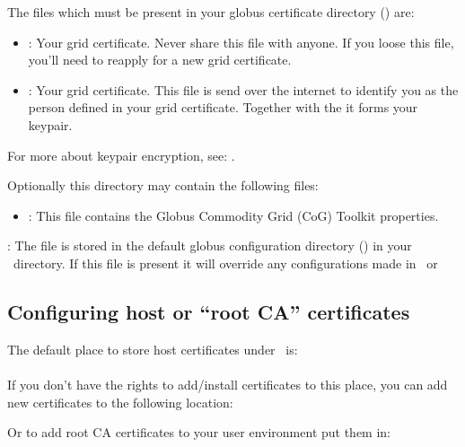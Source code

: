  The files which must be present in your globus certificate directory
 () are:

 \begin{itemize} 
   \item {} : 
     Your  grid certificate. Never share this file with anyone. If you 
     loose this file, you'll need to reapply for a new grid certificate. 
   \item {} : 
     Your  grid certificate. This file is send over the internet to 
     identify you as the person defined in your grid certificate. Together
     with the  it forms your  keypair. 
  \end{itemize} 
  
 For more about  keypair encryption, see: \cite{PKCS}.
 
 Optionally this directory may contain the following files: 

 \begin{itemize} 
   \item {} : 
     This file contains the Globus Commodity Grid (CoG) Toolkit properties.
 \end{itemize} 
 
 : The  file is  stored in the default
 globus configuration directory () in your \HOME\ directory. If this 
 file is present it will override any configurations made in \VLETCONF\ or 

\subsection{Configuring host or ``root CA'' certificates} 

The default place to store host certificates under \Linux\ is:\\

	\tab {}\\
	
If you don't have the rights to add/install certificates to this place, you can 
add new certificates to the following location: 

	\tab \VLETINSTALL{}

Or to add root CA certificates to your user environment put them in: 

	\tab {} 

